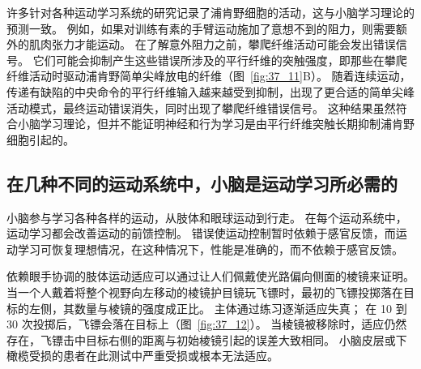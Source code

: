 许多针对各种运动学习系统的研究记录了浦肯野细胞的活动，这与小脑学习理论的预测一致。
例如，如果对训练有素的手臂运动施加了意想不到的阻力，则需要额外的肌肉张力才能运动。
在了解意外阻力之前，攀爬纤维活动可能会发出错误信号。
它们可能会抑制产生这些错误所涉及的平行纤维的突触强度，即那些在攀爬纤维活动时驱动浦肯野简单尖峰放电的纤维（图~\ref{fig:37_11}B）。
随着连续运动，传递有缺陷的中央命令的平行纤维输入越来越受到抑制，出现了更合适的简单尖峰活动模式，最终运动错误消失，同时出现了攀爬纤维错误信号。
这种结果虽然符合小脑学习理论，但并不能证明神经和行为学习是由平行纤维突触长期抑制浦肯野细胞引起的。



\subsection{在几种不同的运动系统中，小脑是运动学习所必需的}

小脑参与学习各种各样的运动，从肢体和眼球运动到行走。
在每个运动系统中，运动学习都会改善运动的前馈控制。
错误使运动控制暂时依赖于感官反馈，而运动学习可恢复理想情况，在这种情况下，性能是准确的，而不依赖于感官反馈。


依赖眼手协调的肢体运动适应可以通过让人们佩戴使光路偏向侧面的棱镜来证明。
当一个人戴着将整个视野向左移动的棱镜护目镜玩飞镖时，最初的飞镖投掷落在目标的左侧，其数量与棱镜的强度成正比。
主体通过练习逐渐适应失真；
在 10 到 30 次投掷后，飞镖会落在目标上（图~\ref{fig:37_12}）。
当棱镜被移除时，适应仍然存在，飞镖击中目标右侧的距离与初始棱镜引起的误差大致相同。
小脑皮层或下橄榄受损的患者在此测试中严重受损或根本无法适应。


